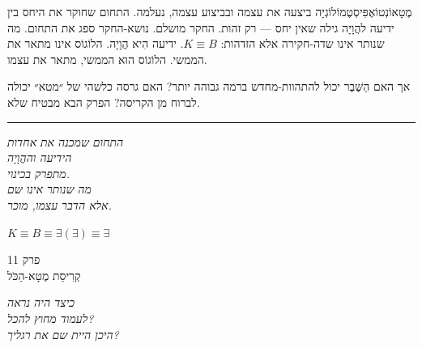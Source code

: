 \documentclass[10pt, openany, oneside]{book}
\renewcommand{\large}{\fontsize{11.5}{14}\selectfont}
\renewcommand{\huge}{\fontsize{17}{21}\selectfont}
\begin{document}
מֶטָאוֹנְטוֹאֶפִּיסְטֶמוֹלוֹגְיָה ביצעה את עצמה ובביצוע עצמה, נעלמה. התחום שחוקר את היחס בין ידיעה להֲוָיָה גילה שאין יחס — רק זהות. החקר מושלם. נושא-החקר ספג את התחום. מה שנותר אינו שדה-חקירה אלא הזדהות: $K \equiv B$. ידיעה הִיא הֲוָיָה. הלוֹגוֹס אינו מתאר את הממשי. הלוֹגוֹס הוּא הממשי, מתאר את עצמו.

אך האם הַשֶּׁבֶר יכול להתהוות-מחדש ברמה גבוהה יותר? האם גרסה כלשהי של ״מטא״ יכולה לברוח מן הקריסה? הפרק הבא מבטיח שלא.

\vspace{2em}

\begin{center}
    \rule{0.15\textwidth}{0.3pt}
\end{center}

\vspace{0.5em}

\begin{center}
    \textit{%
    התחום שמכנה את אחדות\\
    הידיעה וההֲוָיָה\\
    מתפרק בכינוי.}\\[0.8em]
    \textit{מה שנותר אינו שם\\
    אלא הדבר עצמו, מוכר.}
\end{center}

\vspace{0.5em}

\begin{center}
    $K \equiv B \equiv \exists(\exists) \equiv \exists$
\end{center}

%
%
%

\newpage

\begin{center}
    {\huge\textsc{פרק 11}}\\[0.3em]
    {\large\textsc{קְרִיסַת מֶטָא-הַכֹּל}}
\end{center}

\vspace{1.5em}

\begin{center}
    \textit{%
    כיצד היה נראה\\
    לעמוד מחוץ להכל?\\
    היכן היית שם את רגליך?}
\end{center}
\end{document}

